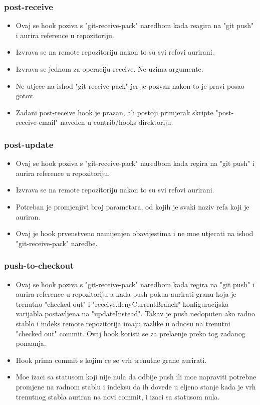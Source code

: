 \documentclass{beamer}
\begin{document}
\begin{frame}
\frametitle{post-receive}
\begin{itemize}
    \item Ovaj se hook poziva s "git-receive-pack" naredbom kada reagira na "git push" i aurira reference u repozitoriju.
    \item Izvrava se na remote repozitoriju nakon to su svi refovi aurirani.
    \item Izvrava se jednom za operaciju receive. Ne uzima argumente.
    \item Ne utjece na ishod "git-receive-pack" jer je pozvan nakon to je pravi posao gotov.
    \item Zadani post-receive hook je prazan, ali postoji primjerak skripte "post-receive-email" naveden u contrib/hooks direktoriju.

\end{itemize}
\end{frame}

\begin{frame}
\frametitle{post-update}
\begin{itemize}
    \item Ovaj se hook poziva s "git-receive-pack" naredbom kada regira na "git push" i aurira reference u repozitoriju.
    \item Izvrava se na remote repozitoriju nakon to su svi refovi aurirani.
    \item Potreban je promjenjivi broj parametara, od kojih je svaki naziv refa koji je auriran.
    \item Ovaj je hook prvenstveno namijenjen obavijestima i ne moe utjecati na ishod "git-receive-pack" naredbe.
\end{itemize}
\end{frame}

\begin{frame}
\frametitle{push-to-checkout}
\begin{itemize}
    \item Ovaj se hook poziva s "git-receive-pack" naredbom kada regira na "git push" i aurira reference u repozitoriju a kada push pokua aurirati granu koja je trenutno "checked out" i "receive.denyCurrentBranch" konfiguracijska varijabla postavljena na "updateInstead". Takav je push nedoputen ako radno stablo i indeks remote repozitorija imaju razlike u odnosu na trenutni "checked out" commit. Ovaj hook koristi se za prelaenje preko tog zadanog ponaanja.
    \item Hook prima commit s kojim ce se vrh trenutne grane aurirati.
    \item Moe izaci sa statusom koji nije nula da odbije push ili moe napraviti potrebne promjene na radnom stablu i indeksu da ih dovede u eljeno stanje kada je vrh trenutnog stabla auriran na novi commit, i izaci sa statusom nula.
\end{itemize}
\end{frame}
\end{document}
